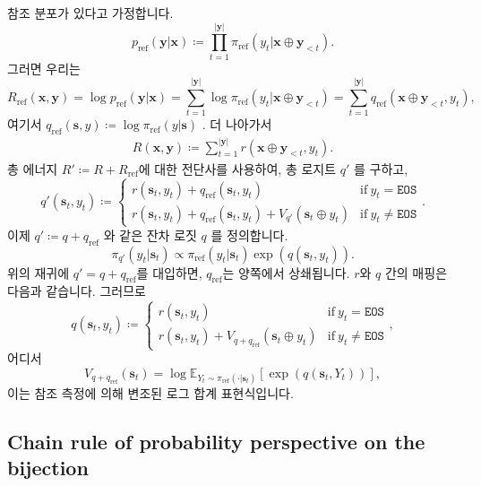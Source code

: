 \documentclass{article}
\def\s{{\bm{s}}}
\def\x{{\bm{x}}}
\def\y{{\bm{y}}}
\def\EE{{\mathbb{E}}}
\def\eos{\texttt{EOS}\xspace}
\def\pref{p_{\mathrm{ref}}}
\def\piref{\pi_{\mathrm{ref}}}
\begin{document}
참조 분포가 있다고 가정합니다.
 \begin{equation} 
 \pref ( \y | \x ) \coloneqq \prod _{t=1}^{| \y |} \piref (y_t| \x \oplus \y _{<t}).
 \end{equation} 
그러면 우리는
 \begin{equation} 
R_ \mathrm{ref} ( \x , \y )
= \log \pref ( \y | \x )
= \sum _{t=1}^{| \y |} \log \piref (y_t| \x \oplus \y _{<t})
= \sum _{t=1}^{| \y |} q_ \mathrm{ref} ( \x \oplus \y _{<t}, y_t),
 \end{equation} 
여기서 $q_\mathrm{ref}(\s, y) \coloneqq \log \piref(y|\s)$ .
더 나아가서
 \begin{align} 
R( \x , \y ) \coloneqq \sum _{t=1}^{| \y |} r( \x \oplus \y _{<t}, y_t).
 \end{align} 
총 에너지 $R' \coloneqq R + R_\mathrm{ref}$에 대한 전단사를 사용하여,
총 로지트 $q'$ 를 구하고,
 \begin{equation} 
q'( \s _t, y_t) \coloneqq 
 \begin{cases} 
r( \s _t, y_t) + q_ \mathrm{ref} ( \s _t, y_t) & \mbox{if} ~ y_t = \eos \\
r( \s _t, y_t) + q_ \mathrm{ref} ( \s _t, y_t) + V_{q'}( \s _t \oplus y_t) & \mbox{if} ~ y_t \neq \eos 
 \end{cases} .
 \end{equation} 
이제 $q' \coloneqq q + q_{\mathrm{ref}}$ 와 같은 잔차 로짓 $q$ 를 정의합니다.
 \begin{equation} 
 \pi _{q'}(y_t| \s _t) \propto \piref (y_t| \s _t) \exp (q( \s _t, y_t)).
 \end{equation} 
위의 재귀에 $q' = q + q_\mathrm{ref}$를 대입하면,
 $q_\mathrm{ref}$는 양쪽에서 상쇄됩니다. $r$와 $q$ 간의 매핑은 다음과 같습니다.
그러므로
 \begin{equation} 
q( \s _t, y_t) \coloneqq 
 \begin{cases} 
r( \s _t, y_t) & \mbox{if} ~ y_t = \eos \\
r( \s _t, y_t) + V_{q + q_ \mathrm{ref} }( \s _t \oplus y_t) & \mbox{if} ~ y_t \neq \eos 
 \end{cases},
 \end{equation} 
어디서
 \begin{equation} 
V_{q + q_ \mathrm{ref} }( \s _t) = \log \EE _{Y_t \sim \piref ( \cdot | \s _t)} [ \exp (q( \s _t, Y_t))],
 \end{equation} 
이는 참조 측정에 의해 변조된 로그 합계 표현식입니다.

\subsection{Chain rule of probability perspective on the bijection} 
 \label{sec:bijection_chain_rule_perspective}
\end{document}
